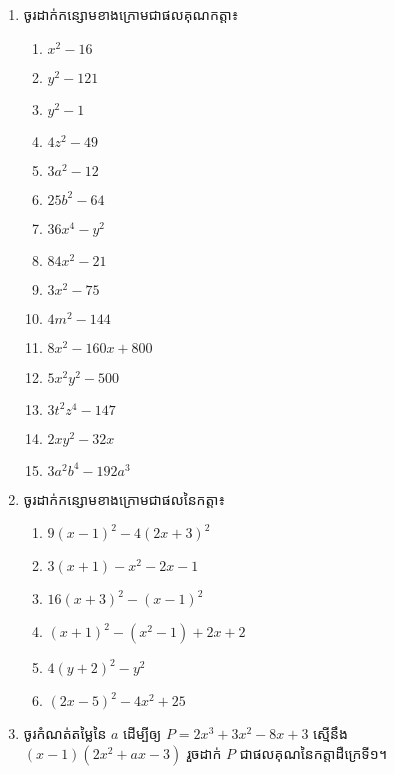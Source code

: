 \begin{enumerate}
\item ចូរដាក់កន្សោមខាងក្រោមជាផលគុណកត្តា៖
\begin{multicols}{3}
\begin{enumerate}[label=\alph*.]
\item $x^2-16$
\item $y^2-121$
\item $y^2-1$
\item $4z^2-49$
\item $3a^2-12$
\item $25b^2-64$
\item $36x^4-y^2$
\item $84x^2-21$
\item $3x^2-75$
\item $4m^2-144$
\item $8x^2-160x+800$
\item $5x^2y^2-500$
\item $3t^2z^4-147$
\item $2xy^2-32x$
\item $3a^2b^4-192a^3$
\end{enumerate}
\end{multicols}

\item ចូរដាក់កន្សោមខាងក្រោមជាផលនៃកត្តា៖
\begin{multicols}{2}
\begin{enumerate}[label=\alph*.]
\item $9(x-1)^2-4(2x+3)^2$
\item $3(x+1)-x^2-2x-1$
\item $16(x+3)^2-(x-1)^2$
\item $(x+1)^2-(x^2-1)+2x+2$
\item $4(y+2)^2-y^2$
\item $(2x-5)^2-4x^2+25$
\end{enumerate}
\end{multicols}

\item ចូរកំណត់តម្លៃនៃ $a$ ដើម្បីឲ្យ $P=2x^3+3x^2-8x+3$ ស្មើនឹង $(x-1)(2x^2+ax-3)$ រួចដាក់ $P$ ជាផលគុណនៃកត្តាដឺក្រេទី១។


\end{enumerate}
